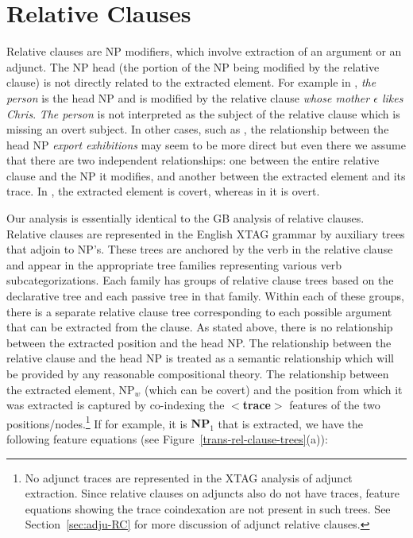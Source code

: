 \chapter{Relative Clauses}
\label{rel_clauses}

Relative clauses are NP modifiers, which involve extraction of an argument
or an adjunct. The NP head (the portion of the NP being modified by the
relative clause) is not directly related to the extracted element.  For
example in , {\it the person} is the head NP and is modified by the
relative clause {\it whose mother $\epsilon$ likes Chris}. {\em The person}
is not interpreted as the subject of the relative clause which is missing
an overt subject. In other cases, such as , the relationship between
the head NP {\em export exhibitions} may seem to be more direct but even
there we assume that there are two independent relationships: one between
the entire relative clause and the NP it modifies, and another between the
extracted element and its trace. In , the extracted element is
covert, whereas in  it is overt. 


Our analysis is essentially identical to the GB analysis of relative
clauses. Relative clauses are represented in the English XTAG grammar by
auxiliary trees that adjoin to NP's. These trees are anchored by the verb
in the relative clause and appear in the appropriate tree families
representing various verb subcategorizations. Each family has groups of
relative clause trees based on the declarative tree and each passive tree
in that family. Within each of these groups, there is a separate relative
clause tree corresponding to each possible argument that can be extracted
from the clause. As stated above, there is no relationship between the
extracted position and the head NP. The relationship between the relative
clause and the head NP is treated as a semantic relationship which will be
provided by any reasonable compositional theory. The relationship between
the extracted element, NP$_w$ (which can be covert) and the position from
which it was extracted is captured by co-indexing the {\bf $<$trace$>$}
features of the two positions/nodes.\footnote{%
%
No adjunct traces are represented in the XTAG analysis of adjunct
extraction. Since relative clauses on adjuncts also do not have traces,
feature equations showing the trace coindexation are not present in such
trees. See Section~\ref{sec:adju-RC} for more discussion of adjunct
relative clauses.%
%
} If for example, it is {\bf NP$_{1}$} that is extracted, we have the
following feature equations (see Figure~\ref{trans-rel-clause-trees}(a)):

